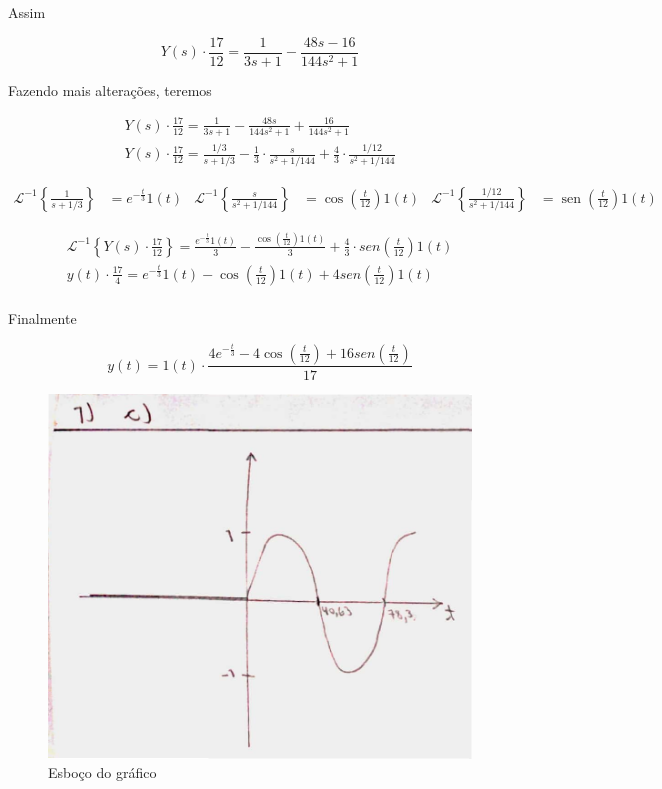 \documentclass{article}
\DeclareMathOperator{\sen}{sen}
\begin{document}
Assim

\[Y(s) \cdot \frac{17}{12} = \frac{1}{3s + 1} - \frac{48s - 16}{144s^2 + 1}\]

Fazendo mais alterações, teremos

\begin{align*}
    Y(s) \cdot \frac{17}{12} = \frac{1}{3s + 1} - \frac{48s}{144s^2 + 1} + \frac{16}{144s^2 + 1}\\
    Y(s) \cdot \frac{17}{12} = \frac{1/3}{s + 1/3} - \frac{1}{3}\cdot\frac{s}{s^2 + 1/144} + \frac{4}{3}\cdot\frac{1/12}{s^2 + 1/144}
\end{align*}

\begin{align*}
    \mathcal{L}^{-1} \left\{\frac{1}{s + 1/3}\right\} &= e^{-\frac{t}{3}}1(t) & \mathcal{L}^{-1} \left\{\frac{s}{s^2 + 1/144}\right\} &= \cos\left(\frac{t}{12}\right)1(t) & \mathcal{L}^{-1} \left\{\frac{1/12}{s^2 + 1/144}\right\} &= \sen\left(\frac{t}{12}\right)1(t)
\end{align*}

\begin{align*}
    \mathcal{L}^{-1} \left\{Y(s) \cdot \frac{17}{12}\right\} = \frac{e^{-\frac{t}{3}}1(t)}{3} - \frac{\cos\left(\frac{t}{12}\right)1(t)}{3} + \frac{4}{3}\cdot sen\left(\frac{t}{12}\right)1(t)\\
    y(t) \cdot \frac{17}{4} = e^{-\frac{t}{3}}1(t) - \cos\left(\frac{t}{12}\right)1(t) + 4sen\left(\frac{t}{12}\right)1(t)\\
\end{align*}

Finalmente

\[y(t) = 1(t)\cdot\frac{4e^{-\frac{t}{3}} - 4\cos\left(\frac{t}{12}\right) + 16sen\left(\frac{t}{12}\right)}{17}\]

\begin{figure}[h]
    \includegraphics[scale=0.21]{Q1_c.png}
    \centering
    \caption{Esboço do gráfico}
\end{figure}
\end{document}
